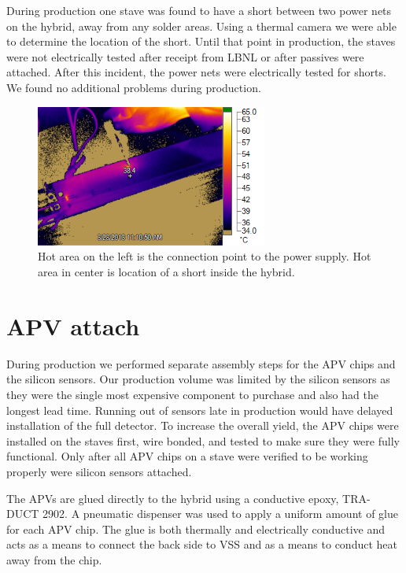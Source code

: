 \documentclass[preprint,12pt]{elsarticle}
\begin{document}
During production one stave was found to have a short between two power nets on
the hybrid, away from any solder areas. Using a thermal camera we were able to
determine the location of the short. Until that point in production, the staves were not
electrically tested after receipt from LBNL or after passives were attached.
After this incident, the power nets were electrically tested for shorts. We found no
additional problems during production.

\begin{figure}[h]
\begin{center}
\includegraphics[width=3in, keepaspectratio=true, angle=0]{graphics/ir_view.png}
\caption{Hot area on the left is the connection point to the power supply.  Hot area
in center is location of a short inside the hybrid.
\label{fig:thermal}}
\end{center}
\end{figure}

\section{APV attach}
During production we performed separate assembly steps for the APV chips and the
silicon sensors. Our production volume was limited by the silicon sensors as they were
the single most expensive component to purchase and also had the longest lead
time. Running out of sensors late in production would have delayed installation
of the full detector. To increase the overall yield, the APV chips were
installed on the staves first, wire bonded, and tested to make sure they were
fully functional. Only after all APV chips on a stave were verified to be
working properly were silicon sensors attached.

The APVs are glued directly to the hybrid using a conductive epoxy, TRA-DUCT
2902. A pneumatic dispenser was used to apply a uniform amount of glue for each
APV chip. The glue is both thermally and electrically conductive and acts as a
means to connect the back side to VSS and as a means to conduct heat away from
the chip.
\end{document}
